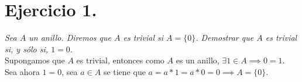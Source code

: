 \section{Ejercicio 1.}
\emph{Sea \(A\) un anillo. Diremos que \(A\) es trivial si
  \(A = \{0\}\). Demostrar que \(A\) es trivial si, y sólo si, \(1 = 0\).}\\

Supongamos que \(A\) es trivial, entonces como \(A\) es un anillo, \(\exists 1
\in A \implies 0 = 1\). Sea ahora \(1 = 0\), sea \(a \in A\) se tiene que \(a =
a*1 = a*0 = 0 \implies A = \{0\}\).
